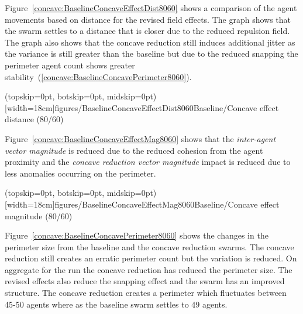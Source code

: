 \documentclass{ieeeaccess}
\begin{document}
Figure~\ref{concave:BaselineConcaveEffectDist8060} shows a comparison of the agent movements based on distance for the revised field effects. The graph shows that the swarm settles to a distance that is closer due to the reduced repulsion field. The graph also shows that the concave reduction still induces additional jitter as the variance is still greater than the baseline but due to the reduced snapping the perimeter agent count shows greater stability~(\ref{concave:BaselineConcavePerimeter8060}). 

\Figure[t!](topskip=0pt, botskip=0pt, midskip=0pt)[width=18cm]{figures/BaselineConcaveEffectDist8060}{Baseline/Concave effect distance (80/60)\label{concave:BaselineConcaveEffectDist8060}}

Figure~\ref{concave:BaselineConcaveEffectMag8060} shows that the \textit{inter-agent vector magnitude} is reduced due to the reduced cohesion from the agent proximity and the \textit{concave reduction vector magnitude} impact is reduced due to less anomalies occurring on the perimeter.

\Figure[t!](topskip=0pt, botskip=0pt, midskip=0pt)[width=18cm]{figures/BaselineConcaveEffectMag8060}{Baseline/Concave effect magnitude (80/60)\label{concave:BaselineConcaveEffectMag8060}}

Figure~\ref{concave:BaselineConcavePerimeter8060} shows the changes in the perimeter size from the baseline and the concave reduction swarms. The concave reduction still creates an erratic perimeter count but the variation is reduced. On aggregate for the run the concave reduction has reduced the perimeter size. The revised effects also reduce the snapping effect and the swarm has an improved structure. The concave reduction creates a perimeter which fluctuates between 45-50 agents where as the baseline swarm settles to 49 agents.
\end{document}
